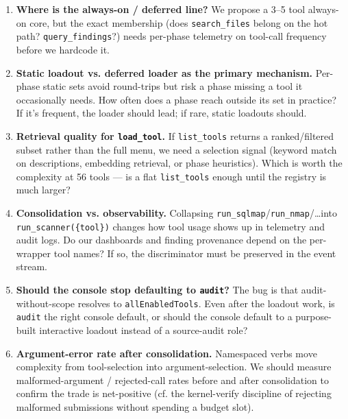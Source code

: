\documentclass[11pt]{article}
\begin{document}
\begin{enumerate}[leftmargin=*]
  \item \textbf{Where is the always-on / deferred line?} We propose a 3--5 tool
  always-on core, but the exact membership (does \texttt{search\_files} belong on
  the hot path? \texttt{query\_findings}?) needs per-phase telemetry on tool-call
  frequency before we hardcode it.
  \item \textbf{Static loadout vs. deferred loader as the primary mechanism.}
  Per-phase static sets avoid round-trips but risk a phase missing a tool it
  occasionally needs. How often does a phase reach outside its set in practice? If
  it's frequent, the loader should lead; if rare, static loadouts should.
  \item \textbf{Retrieval quality for \texttt{load\_tool}.} If \texttt{list\_tools}
  returns a ranked/filtered subset rather than the full menu, we need a selection
  signal (keyword match on descriptions, embedding retrieval, or phase heuristics).
  Which is worth the complexity at 56 tools --- is a flat \texttt{list\_tools}
  enough until the registry is much larger?
  \item \textbf{Consolidation vs. observability.} Collapsing
  \texttt{run\_sqlmap}/\texttt{run\_nmap}/\ldots into
  \texttt{run\_scanner(\{tool\})} changes how tool usage shows up in telemetry and
  audit logs. Do our dashboards and finding provenance depend on the per-wrapper
  tool names? If so, the discriminator must be preserved in the event stream.
  \item \textbf{Should the console stop defaulting to \texttt{audit}?} The bug is
  that audit-without-scope resolves to \texttt{allEnabledTools}. Even after the
  loadout work, is \texttt{audit} the right console default, or should the console
  default to a purpose-built interactive loadout instead of a source-audit role?
  \item \textbf{Argument-error rate after consolidation.} Namespaced verbs move
  complexity from tool-selection into argument-selection. We should measure
  malformed-argument / rejected-call rates before and after consolidation to
  confirm the trade is net-positive (cf. the kernel-verify discipline of rejecting
  malformed submissions without spending a budget slot).
\end{enumerate}
\end{document}
